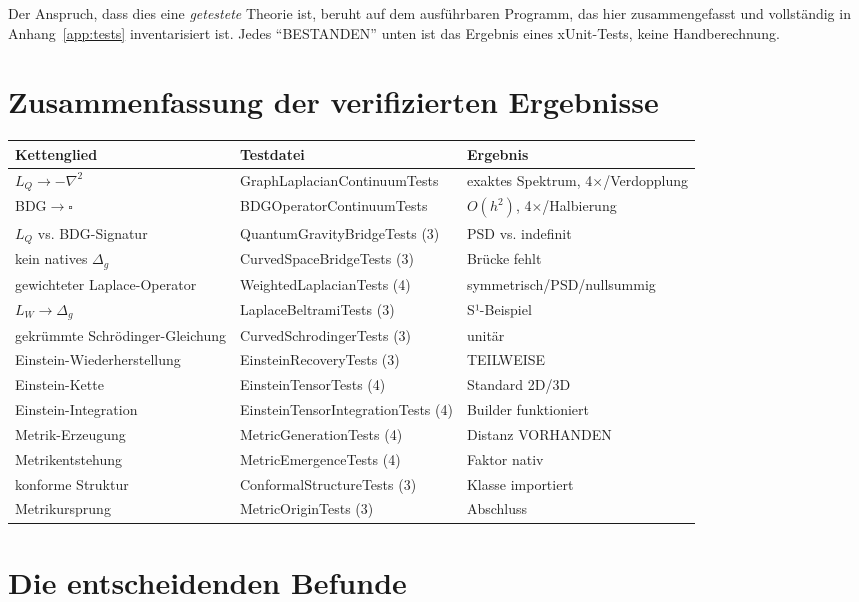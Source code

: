 \documentclass[10pt,twoside,openany]{book}
\begin{document}
Der Anspruch, dass dies eine \emph{getestete} Theorie ist, beruht auf dem ausführbaren
Programm, das hier zusammengefasst und vollständig in Anhang~\ref{app:tests} inventarisiert
ist. Jedes ``BESTANDEN'' unten ist das Ergebnis eines xUnit-Tests, keine Handberechnung.

\section{Zusammenfassung der verifizierten Ergebnisse}

\begin{center}
\begin{tabular}{lll}
\toprule
Kettenglied & Testdatei & Ergebnis \\
\midrule
$L_Q\to-\nabla^2$ & GraphLaplacianContinuumTests & exaktes Spektrum, 4$\times$/Verdopplung \\
BDG$\to\square$ & BDGOperatorContinuumTests & $O(h^2)$, 4$\times$/Halbierung \\
$L_Q$ vs. BDG-Signatur & QuantumGravityBridgeTests (3) & PSD vs. indefinit \\
kein natives $\Delta_g$ & CurvedSpaceBridgeTests (3) & Brücke fehlt \\
gewichteter Laplace-Operator & WeightedLaplacianTests (4) & symmetrisch/PSD/nullsummig \\
$L_W\to\Delta_g$ & LaplaceBeltramiTests (3) & S¹-Beispiel \\
gekrümmte Schr\"odinger-Gleichung & CurvedSchrodingerTests (3) & unitär \\
Einstein-Wiederherstellung & EinsteinRecoveryTests (3) & TEILWEISE \\
Einstein-Kette & EinsteinTensorTests (4) & Standard 2D/3D \\
Einstein-Integration & EinsteinTensorIntegrationTests (4) & Builder funktioniert \\
Metrik-Erzeugung & MetricGenerationTests (4) & Distanz VORHANDEN \\
Metrikentstehung & MetricEmergenceTests (4) & Faktor nativ \\
konforme Struktur & ConformalStructureTests (3) & Klasse importiert \\
Metrikursprung & MetricOriginTests (3) & Abschluss \\
\bottomrule
\end{tabular}
\end{center}

\section{Die entscheidenden Befunde}
\end{document}

